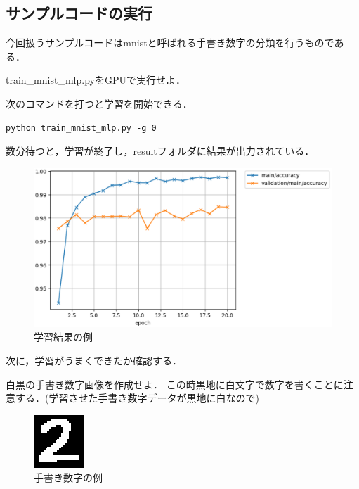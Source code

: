 \subsection{サンプルコードの実行}
今回扱うサンプルコードはmnistと呼ばれる手書き数字の分類を行うものである．
\begin{practice}
train\_mnist\_mlp.pyをGPUで実行せよ．

次のコマンドを打つと学習を開始できる．
\begin{lstlisting}[basicstyle=\ttfamily\footnotesize, frame=single]
python train_mnist_mlp.py -g 0
\end{lstlisting}

\end{practice}
数分待つと，学習が終了し，resultフォルダに結果が出力されている．
\begin{figure}[ht]
	\begin{center}
		\includegraphics[width=0.7\linewidth] {images/YamasakiLab/sec2/accuracy.eps}
		\caption{学習結果の例}
		\label{fig:accuracy}
	\end{center}
\end{figure}


次に，学習がうまくできたか確認する．
\begin{practice}
白黒の手書き数字画像を作成せよ．
この時黒地に白文字で数字を書くことに注意する．(学習させた手書き数字データが黒地に白なので)
\end{practice}

\begin{figure}[ht]
	\begin{center}
		\includegraphics[width=0.2\linewidth] {images/YamasakiLab/sec2/number.eps}
		\caption{手書き数字の例}
		\label{fig:num}
	\end{center}
\end{figure}

